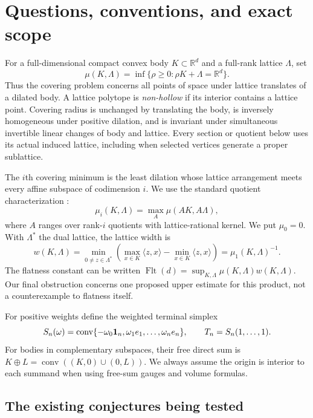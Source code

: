 \documentclass[11pt,a4paper]{article}
\theoremstyle{remark}\newtheorem{remark}[theorem]{Remark}
\DeclareMathOperator{\conv}{conv}
\DeclareMathOperator{\Flt}{Flt}
\newcommand{\R}{\mathbb R}\newcommand{\Z}{\mathbb Z}\newcommand{\Q}{\mathbb Q}
\begin{document}
\section{Questions, conventions, and exact scope}
\label{r3:intro}

For a full-dimensional compact convex body $K\subset\R^d$ and a
full-rank lattice $\Lambda$, set
\[
 \mu(K,\Lambda)=\inf\{\rho\ge0:\rho K+\Lambda=\R^d\}.
\]
Thus the covering problem concerns all points of space under lattice
translates of a dilated body. A lattice polytope is \emph{non-hollow}
if its interior contains a lattice point. Covering radius is unchanged
by translating the body, is inversely homogeneous under positive
dilation, and is invariant under simultaneous invertible linear changes
of body and lattice. Every section or quotient below uses its actual
induced lattice, including when selected vertices generate a proper
sublattice.

The $i$th covering minimum is the least dilation whose lattice
arrangement meets every affine subspace of codimension $i$. We use
the standard quotient characterization \cite[Section 1]{CSS}:
\begin{equation}\label{intro:quotient}
 \mu_i(K,\Lambda)=\max_A\mu(AK,A\Lambda),
\end{equation}
where $A$ ranges over rank-$i$ quotients with lattice-rational kernel.
We put $\mu_0=0$. With $\Lambda^*$ the dual lattice, the lattice width is
\[
 w(K,\Lambda)=\min_{0\ne z\in\Lambda^*}
  \left(\max_{x\in K}\langle z,x\rangle-
        \min_{x\in K}\langle z,x\rangle\right)=\mu_1(K,\Lambda)^{-1}.
\]
The flatness constant can be written
$\Flt(d)=\sup_{K,\Lambda}\mu(K,\Lambda)w(K,\Lambda)$.
Our final obstruction concerns one proposed upper estimate for this
product, not a counterexample to flatness itself.

For positive weights define the weighted terminal simplex
\begin{equation}\label{r3:weighted-simplex}
 S_n(\omega)=\conv\{-\omega_0\one_n,
                       \omega_1e_1,\ldots,\omega_ne_n\},
 \qquad T_n=S_n(1,\ldots,1).
\end{equation}
For bodies in complementary subspaces, their free direct sum is
$K\oplus L=\conv((K,0)\cup(0,L))$. We always assume the origin is
interior to each summand when using free-sum gauges and volume formulas.

\subsection{The existing conjectures being tested}
\end{document}
